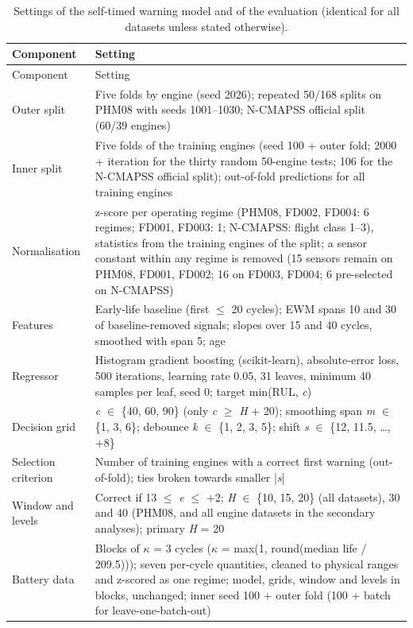 \documentclass[11pt,a4paper]{article}
\begin{document}
{\footnotesize\setlength{\tabcolsep}{4pt}
\begin{longtable}{@{}>{\raggedright\arraybackslash}p{}>{\raggedright\arraybackslash}p{}@{}}
\caption{Settings of the self-timed warning model and of the evaluation (identical for all datasets unless stated otherwise).}\\
\toprule
Component & Setting \\
\midrule\endfirsthead
\toprule
Component & Setting \\
\midrule\endhead
\bottomrule\endfoot
Outer split & Five folds by engine (seed 2026); repeated 50/168 splits on PHM08 with seeds 1001--1030; N-CMAPSS official split (60/39 engines) \\
Inner split & Five folds of the training engines (seed 100 + outer fold; 2000 + iteration for the thirty random 50-engine tests; 106 for the N-CMAPSS official split); out-of-fold predictions for all training engines \\
Normalisation & z-score per operating regime (PHM08, FD002, FD004: 6 regimes; FD001, FD003: 1; N-CMAPSS: flight class 1--3), statistics from the training engines of the split; a sensor constant within any regime is removed (15 sensors remain on PHM08, FD001, FD002; 16 on FD003, FD004; 6 pre-selected on N-CMAPSS) \\
Features & Early-life baseline (first $\le$ 20 cycles); EWM spans 10 and 30 of baseline-removed signals; slopes over 15 and 40 cycles, smoothed with span 5; age \\
Regressor & Histogram gradient boosting (scikit-learn), absolute-error loss, 500 iterations, learning rate 0.05, 31 leaves, minimum 40 samples per leaf, seed 0; target min(RUL, \textit{c}) \\
Decision grid & \textit{c} $\in$ \{40, 60, 90\} (only \textit{c} $\ge$ \textit{H} + 20); smoothing span \textit{m} $\in$ \{1, 3, 6\}; debounce \textit{k} $\in$ \{1, 2, 3, 5\}; shift \textit{s} $\in$ \{\textminus{}12, \textminus{}11.5, \ldots{}, +8\} \\
Selection criterion & Number of training engines with a correct first warning (out-of-fold); ties broken towards smaller |\textit{s}| \\
Window and levels & Correct if \textminus{}13 $\le$ \textit{e} $\le$ +2; \textit{H} $\in$ \{10, 15, 20\} (all datasets), 30 and 40 (PHM08, and all engine datasets in the secondary analyses); primary \textit{H} = 20 \\
Battery data & Blocks of $\kappa$ = 3 cycles ($\kappa$ = max(1, round(median life / 209.5))); seven per-cycle quantities, cleaned to physical ranges and z-scored as one regime; model, grids, window and levels in blocks, unchanged; inner seed 100 + outer fold (100 + batch for leave-one-batch-out) \\

\end{longtable}}
\end{document}
